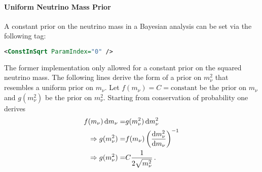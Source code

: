 \paragraph{Uniform Neutrino Mass Prior}
A constant prior on the neutrino mass in a Bayesian analysis can be set via the following tag:
\begin{lstlisting}[language=XML]
<ConstInSqrt ParamIndex="0" />
\end{lstlisting}
The former implementation only allowed for a constant prior on the squared neutrino mass. The following lines derive the form of a prior on $m_\nu^2$ that resembles a uniform prior on $m_\nu$. Let $f(m_\nu)=C=\mathrm{constant}$ be the prior on $m_\nu$ and $g(m_\nu^2)$ be the prior on $m_\nu^2$. Starting from conservation of probability one derives
\begin{align*}
f(m_\nu)\mathop{}\!\mathrm{d} m_\nu =& g(m_\nu^2) \mathop{}\!\mathrm{d} m_\nu^2 \\
\Rightarrow
g(m_\nu^2) =& f(m_\nu) \left( \frac{\mathop{}\!\mathrm{d} m_\nu^2}{\mathop{}\!\mathrm{d} m_\nu} \right)^{-1} \\
\Rightarrow
g(m_\nu^2) =& C \frac{1}{2\sqrt{m_\nu^2}}
\text{\,.}
\end{align*}